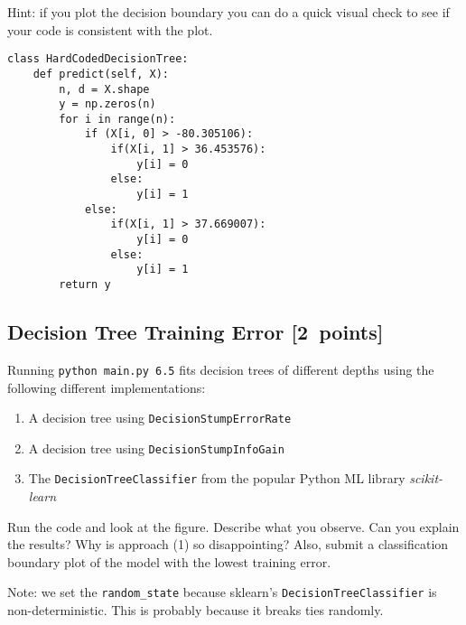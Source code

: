 \documentclass{article}
\newcommand{\blu}[1]{{\textcolor{blu}{#1}}}
\let\ask\blu
\newcommand\pts[1]{\textcolor{pointscolour}{[#1~points]}}
\begin{document}
  Hint: if you plot the decision boundary you can do a quick visual check to see if your code is consistent with the plot.

\begin{verbatim}
class HardCodedDecisionTree:
    def predict(self, X):
        n, d = X.shape
        y = np.zeros(n)
        for i in range(n):
            if (X[i, 0] > -80.305106):
                if(X[i, 1] > 36.453576):
                    y[i] = 0
                else:
                    y[i] = 1
            else:
                if(X[i, 1] > 37.669007):
                    y[i] = 0
                else:
                    y[i] = 1
        return y
\end{verbatim}
\newpage
  \subsection{Decision Tree Training Error \pts{2}}

  Running \texttt{python main.py 6.5} fits decision trees of different depths using the following different implementations:
  \begin{enumerate}
  \item A decision tree using \texttt{DecisionStumpErrorRate}
  \item A decision tree using \texttt{DecisionStumpInfoGain}
  \item The \texttt{DecisionTreeClassifier} from the popular Python ML library \emph{scikit-learn}
  \end{enumerate}

  Run the code and look at the figure.
  \ask{Describe what you observe. Can you explain the results?} Why is approach (1) so disappointing? Also, \ask{submit a classification boundary plot of the model with the lowest training error}.

  Note: we set the \verb|random_state| because sklearn's \texttt{DecisionTreeClassifier} is non-deterministic. This is probably
  because it breaks ties randomly.
\end{document}
